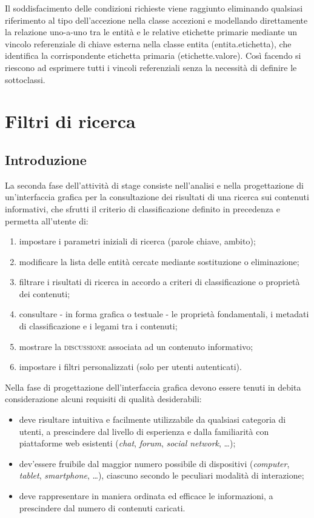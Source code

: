 Il soddisfacimento delle condizioni richieste viene raggiunto eliminando qualsiasi riferimento al tipo dell'accezione nella classe \textsf{accezioni} e modellando direttamente la relazione uno-a-uno tra le entità e le relative etichette primarie mediante un vincolo referenziale di chiave esterna nella classe \textsf{entita} (\textsf{entita.etichetta}), che identifica la corrispondente etichetta primaria (\textsf{etichette.valore}). Così facendo si riescono ad esprimere tutti i vincoli referenziali senza la necessità di definire le sottoclassi.

\section{Filtri di ricerca}
\label{sec:tesi:stage:gui:filtri}

\subsection{Introduzione}
La seconda fase dell'attività di stage consiste nell'analisi e nella progettazione di un'interfaccia grafica per la consultazione dei risultati di una ricerca sui contenuti informativi, che sfrutti il criterio di classificazione definito in precedenza e permetta all'utente di:
\begin{enumerate}
	\item impostare i parametri iniziali di ricerca (parole chiave, ambito);
	\item modificare la lista delle entità cercate mediante sostituzione o eliminazione;
	\item filtrare i risultati di ricerca in accordo a criteri di classificazione o proprietà dei contenuti;
	\item consultare - in forma grafica o testuale - le proprietà fondamentali, i metadati di classificazione e i legami tra i contenuti;
	\item mostrare la \textsc{discussione} associata ad un contenuto informativo;
	\item impostare i filtri personalizzati (solo per utenti autenticati).
\end{enumerate}

Nella fase di progettazione dell'interfaccia grafica devono essere tenuti in debita considerazione alcuni requisiti di qualità desiderabili:
\begin{itemize}
  \item deve risultare intuitiva e facilmente utilizzabile da qualsiasi categoria di utenti, a prescindere dal livello di esperienza e dalla familiarità con piattaforme web esistenti (\textit{chat}, \textit{forum}, \textit{social network}, \ldots);
  \item dev'essere fruibile dal maggior numero possibile di dispositivi (\textit{computer}, \textit{tablet}, \textit{smartphone}, \ldots), ciascuno secondo le peculiari modalità di interazione;
  \item deve rappresentare in maniera ordinata ed efficace le informazioni, a prescindere dal numero di contenuti caricati.
\end{itemize}

